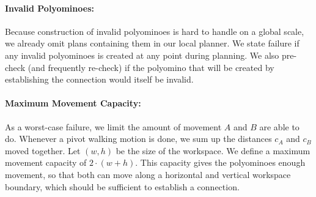 \paragraph{Invalid Polyominoes:}

Because construction of invalid polyominoes is hard to handle on a global scale, we already omit plans containing them in our local planner.
We state failure if any invalid polyominoes is created at any point during planning.
We also pre-check (and frequently re-check) if the polyomino that will be created by establishing the connection would itself be invalid. 

\paragraph{Maximum Movement Capacity:}

As a worst-case failure, we limit the amount of movement $A$ and $B$ are able to do.
Whenever a pivot walking motion is done, we sum up the distances $c_A$ and $c_B$ moved together.
Let $(w,h)$ be the size of the workspace.
We define a maximum movement capacity of $2\cdot(w+h)$.
This capacity gives the polyominoes enough movement, so that both can move along a horizontal and vertical workspace boundary, which should be sufficient to establish a connection.

